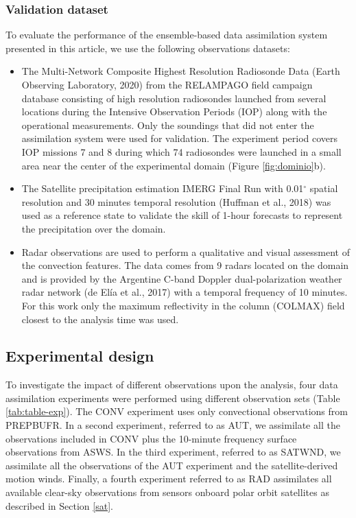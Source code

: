 \documentclass[final,5p,times,twocolumn,authoryear]{elsarticle} %
\begin{document}
\hypertarget{validation-dataset}{%
\subsubsection{Validation dataset}\label{validation-dataset}}

To evaluate the performance of the ensemble-based data assimilation system presented in this article, we use the following observations datasets:

\begin{itemize}
\item
  The Multi-Network Composite Highest Resolution Radiosonde Data (Earth Observing Laboratory, 2020) from the RELAMPAGO field campaign database consisting of high resolution radiosondes launched from several locations during the Intensive Observation Periods (IOP) along with the operational measurements. Only the soundings that did not enter the assimilation system were used for validation. The experiment period covers IOP missions 7 and 8 during which 74 radiosondes were launched in a small area near the center of the experimental domain (Figure \ref{fig:dominio}b).
\item
  The Satellite precipitation estimation IMERG Final Run with 0.01\(^{\circ}\) spatial resolution and 30 minutes temporal resolution (Huffman et al., 2018) was used as a reference state to validate the skill of 1-hour forecasts to represent the precipitation over the domain.
\item
  Radar observations are used to perform a qualitative and visual assessment of the convection features. The data comes from 9 radars located on the domain and is provided by the Argentine C-band Doppler dual-polarization weather radar network (de Elía et al., 2017) with a temporal frequency of 10 minutes. For this work only the maximum reflectivity in the column (COLMAX) field closest to the analysis time was used.
\end{itemize}

\hypertarget{experimental-design}{%
\subsection{Experimental design}\label{experimental-design}}

To investigate the impact of different observations upon the analysis, four data assimilation experiments were performed using different observation sets (Table \ref{tab:table-exp}). The CONV experiment uses only convectional observations from PREPBUFR. In a second experiment, referred to as AUT, we assimilate all the observations included in CONV plus the 10-minute frequency surface observations from ASWS. In the third experiment, referred to as SATWND, we assimilate all the observations of the AUT experiment and the satellite-derived motion winds. Finally, a fourth experiment referred to as RAD assimilates all available clear-sky observations from sensors onboard polar orbit satellites as described in Section \ref{sat}.
\end{document}
